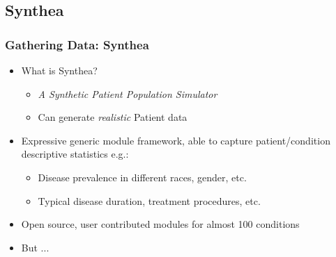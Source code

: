 \documentclass{beamer}
\begin{document}
\subsection{Synthea} %
\begin{frame}
\frametitle{Gathering Data: Synthea}
\begin{itemize}
	\item What is Synthea?
	\begin{itemize}
			\item \textit{A Synthetic Patient Population Simulator}
			\item Can generate \textit{realistic} Patient data
	\end{itemize}
	\item Expressive generic module framework, able to capture patient/condition descriptive statistics e.g.:
		\begin{itemize}
			\item Disease prevalence in different races, gender, etc.
			\item Typical disease duration, treatment procedures, etc.
		\end{itemize}
	\item Open source, user contributed modules for almost 100 conditions
	\item But ...
\end{itemize}
\end{frame}
\end{document}
